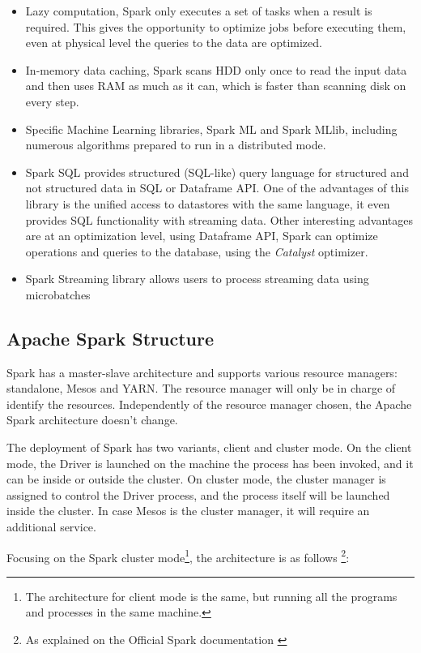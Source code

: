 \documentclass[11pt]{book} %
\begin{document}
    \begin{itemize}
      \item Lazy computation, Spark only executes a set of tasks when a result is required. This gives the opportunity to optimize jobs before executing them, even at physical level the queries to the data are optimized.
      \item In-memory data caching, Spark scans HDD only once to read the input data and then uses RAM as much as it can, which is faster than scanning disk on every step.
      \item Specific Machine Learning libraries, Spark ML and Spark MLlib, including numerous algorithms prepared to run in a distributed mode.
      \item Spark SQL provides structured (SQL-like) query language for structured and not structured data in SQL or Dataframe API. One of the advantages of this library is the unified access to datastores with the same language, it even provides SQL functionality with streaming data. Other interesting advantages are at an optimization level, using Dataframe API, Spark can optimize operations and queries to the database, using the \emph{Catalyst} optimizer.
      \item Spark Streaming library allows users to process streaming data using microbatches
    \end{itemize}

    \subsection{Apache Spark Structure}

      Spark has a master-slave architecture and supports various resource managers: standalone, Mesos and YARN. The resource manager will only be in charge of identify the resources. Independently of the resource manager chosen, the Apache Spark architecture doesn't change.

      The deployment of Spark has two variants, client and cluster mode. On the client mode, the Driver is launched on the machine the process has been invoked, and it can be inside or outside the cluster. On cluster mode, the cluster manager is assigned to control the Driver process, and the process itself will be launched inside the cluster. In case Mesos is the cluster manager, it will require an additional service.

      Focusing on the Spark cluster mode\footnote{The architecture for client mode is the same, but running all the programs and processes in the same machine.}, the architecture is as follows \footnote{As explained on the Official Spark documentation \cite{Spark_documentation}}:
\end{document}

